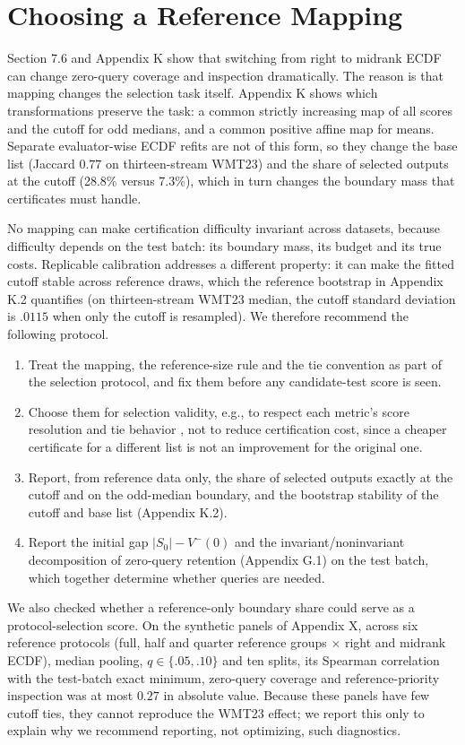 \documentclass[11pt]{article}
\newcommand{\Sz}{S_0}
\begin{document}
\section{Choosing a Reference Mapping}
\label{app:mapping}
Section 7.6 and Appendix K show that switching from right to midrank ECDF can change zero-query coverage and inspection dramatically. The reason is that mapping changes the selection task itself. Appendix K shows which transformations preserve the task: a common strictly increasing map of all scores and the cutoff for odd medians, and a common positive affine map for means. Separate evaluator-wise ECDF refits are not of this form, so they change the base list (Jaccard $0.77$ on thirteen-stream WMT23) and the share of selected outputs at the cutoff (28.8\% versus 7.3\%), which in turn changes the boundary mass that certificates must handle.

No mapping can make certification difficulty invariant across datasets, because difficulty depends on the test batch: its boundary mass, its budget and its true costs. Replicable calibration \citep{papamichalis2026replicable} addresses a different property: it can make the fitted cutoff stable across reference draws, which the reference bootstrap in Appendix K.2 quantifies (on thirteen-stream WMT23 median, the cutoff standard deviation is $.0115$ when only the cutoff is resampled). We therefore recommend the following protocol.
\begin{enumerate}
\item Treat the mapping, the reference-size rule and the tie convention as part of the selection protocol, and fix them before any candidate-test score is seen.
\item Choose them for selection validity, e.g., to respect each metric's score resolution and tie behavior \citep{deutsch2023ties}, not to reduce certification cost, since a cheaper certificate for a different list is not an improvement for the original one.
\item Report, from reference data only, the share of selected outputs exactly at the cutoff and on the odd-median boundary, and the bootstrap stability of the cutoff and base list (Appendix K.2).
\item Report the initial gap $|\Sz|-V^-(0)$ and the invariant/noninvariant decomposition of zero-query retention (Appendix G.1) on the test batch, which together determine whether queries are needed.
\end{enumerate}
We also checked whether a reference-only boundary share could serve as a protocol-selection score. On the synthetic panels of Appendix X, across six reference protocols (full, half and quarter reference groups $\times$ right and midrank ECDF), median pooling, $q\in\{.05,.10\}$ and ten splits, its Spearman correlation with the test-batch exact minimum, zero-query coverage and reference-priority inspection was at most $0.27$ in absolute value. Because these panels have few cutoff ties, they cannot reproduce the WMT23 effect; we report this only to explain why we recommend reporting, not optimizing, such diagnostics.
\end{document}
